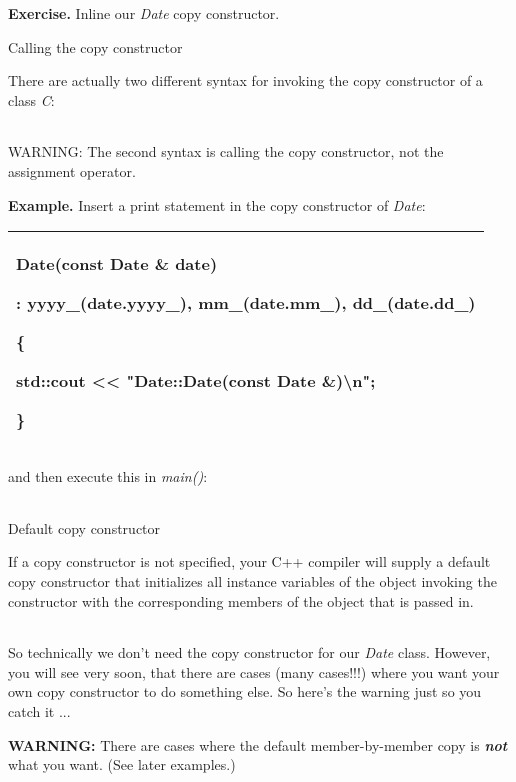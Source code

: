 \documentclass[
]{article}
\begin{document}
\textbf{Exercise.} Inline our \emph{Date} copy constructor.

Calling the copy constructor

There are actually two different syntax for invoking the copy
constructor of a class \emph{C}:

\begin{longtable}[]{@{}@{}}
\toprule
\endhead
\bottomrule
\end{longtable}

WARNING: The second syntax is calling the copy constructor, not the
assignment operator.

\textbf{Example.} Insert a print statement in the copy constructor of
\emph{Date}:

\begin{longtable}[]{@{}l@{}}
\toprule
\endhead
\begin{minipage}[t]{0.97\columnwidth}\raggedright
Date(const Date \& date)

: yyyy\_(date.yyyy\_), mm\_(date.mm\_), dd\_(date.dd\_)

\{

std::cout \textless\textless{} "Date::Date(const Date
\&)\textbackslash n";

\}\strut
\end{minipage}\tabularnewline
\bottomrule
\end{longtable}

and then execute this in \emph{main()}:

\begin{longtable}[]{@{}@{}}
\toprule
\endhead
\bottomrule
\end{longtable}

Default copy constructor

If a copy constructor is not specified, your C++ compiler will supply a
default copy constructor that initializes all instance variables of the
object invoking the constructor with the corresponding members of the
object that is passed in.

\begin{longtable}[]{@{}@{}}
\toprule
\endhead
\bottomrule
\end{longtable}

So technically we don't need the copy constructor for our \emph{Date}
class. However, you will see very soon, that there are cases (many
cases!!!) where you want your own copy constructor to do something else.
So here's the warning just so you catch it ...

\textbf{WARNING:} There are cases where the default member-by-member
copy is \emph{\textbf{not}} what you want. (See later examples.)
\end{document}
